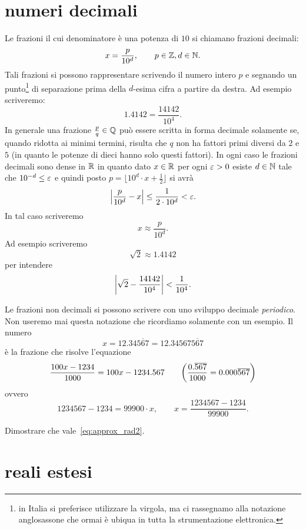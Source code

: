 \section{numeri decimali}
%
Le frazioni il cui denominatore è una potenza
di $10$ si chiamano frazioni decimali:
\[
  x = \frac{p}{10^d}, \qquad p\in \mathbb Z, d\in \mathbb N.
\]
Tali frazioni si possono rappresentare
scrivendo il numero
intero $p$ e segnando un punto\footnote{%
in Italia si preferisce utilizzare la virgola, ma
ci rassegnamo alla notazione anglosassone che ormai è
ubiqua in tutta la strumentazione elettronica.
}
di separazione
prima della $d$-esima cifra a partire da destra.
Ad esempio scriveremo:
\[
  1.4142 = \frac{14142}{10^4}.
\]
In generale una frazione $\frac{p}{q}\in \mathbb Q$
può essere scritta in forma decimale solamente
se, quando ridotta ai minimi termini,
risulta che $q$ non ha fattori primi diversi
da $2$ e $5$ (in quanto le potenze di dieci
hanno solo questi fattori).
In ogni caso le frazioni decimali sono dense in $\mathbb R$
in quanto dato $x\in \mathbb R$ per ogni $\varepsilon>0$ esiste
$d\in \mathbb N$ tale che $10^{-d}\le\varepsilon$ e quindi
posto $p=\lfloor 10^d\cdot x + \frac 1 2\rfloor$
si avrà
\[
    {\left|\frac{p}{10^d} - x\right|} \le \frac{1}{2\cdot 10^d} < \varepsilon.
\]
In tal caso scriveremo
\[
  x \approx \frac{p}{10^d}.
\]
Ad esempio scriveremo
\[
  \sqrt 2 \approx 1.4142
\]
per intendere
\begin{equation}\label{eq:approx_rad2}
{\left|\sqrt 2 - \frac{14142}{10^4}\right|}<\frac{1}{10^4}.
\end{equation}

Le frazioni non decimali si possono scrivere con uno sviluppo
decimale \emph{periodico}. Non useremo mai questa notazione
che ricordiamo solamente con un esempio.
Il numero
\[
  x = 12.34\overline{567}
    = 12.34567\overline{567}
\]
è la frazione che risolve l'equazione
\[
  \frac{100x - 1234}{1000}
  = 100x-1234.567
  \qquad
{\left( \frac{0.\overline{567}}{1000}
= 0.000\overline{567}  \right)}
\]
ovvero
\[
  1234567 - 1234 = 99900 \cdot x,
  \qquad x = \frac{1234567-1234}{99900}.
\]

\begin{exercise}
Dimostrare che vale~\eqref{eq:approx_rad2}.
\end{exercise}

\section{reali estesi}


